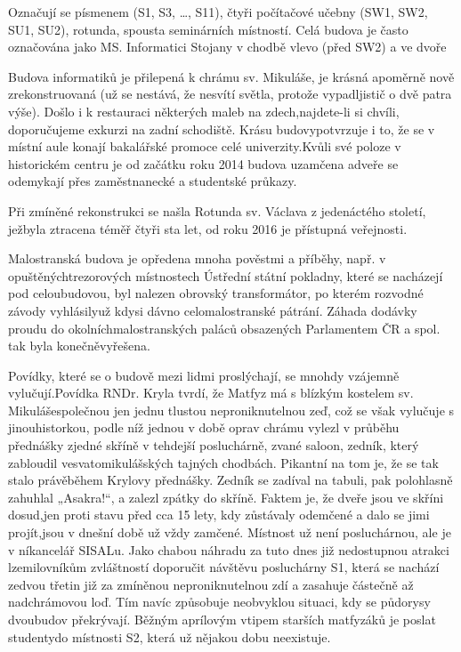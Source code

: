 {Označují se písmenem  (S1, S3, \dots, S11), čtyři počítačové učebny (SW1,
SW2, SU1, SU2), rotunda, spousta seminárních místností. Celá budova je často
označována jako MS.}
{Informatici}
{Stojany v chodbě vlevo (před SW2) a ve dvoře}

\noindent Budova informatiků je přilepená k chrámu sv. Mikuláše, je krásná
apoměrně nově zrekonstruovaná (už se nestává, že nesvítí světla, protože
vypadljistič o dvě patra výše). Došlo i k restauraci některých maleb na
zdech,najdete-li si chvíli, doporučujeme exkurzi na zadní schodiště. Krásu
budovypotvrzuje i to, že se v místní aule konají bakalářské promoce celé
univerzity.Kvůli své poloze v historickém centru je od začátku roku 2014 budova
uzamčena adveře se odemykají přes zaměstnanecké a studentské průkazy.

Při zmíněné rekonstrukci se našla Rotunda sv. Václava z jedenáctého století,
ježbyla ztracena téměř čtyři sta let, od roku 2016 je přístupná veřejnosti.

Malostranská budova je opředena mnoha pověstmi a příběhy, např. v
opuštěnýchtrezorových místnostech Ústřední státní pokladny, které se nacházejí
pod celoubudovou, byl nalezen obrovský transformátor, po kterém rozvodné závody
vyhlásilyuž kdysi dávno celomalostranské pátrání. Záhada dodávky proudu do
okolníchmalostranských paláců obsazených Parlamentem ČR a spol. tak byla
konečněvyřešena.

Povídky, které se o budově mezi lidmi proslýchají, se mnohdy vzájemně
vylučují.Povídka RNDr. Kryla tvrdí, že Matfyz má s blízkým kostelem sv.
Mikulášespolečnou jen jednu tlustou neproniknutelnou zeď, což se však vylučuje s
jinouhistorkou, podle níž jednou v době oprav chrámu vylezl v průběhu přednášky
zjedné skříně v tehdejší posluchárně, zvané saloon, zedník, který zabloudil
vesvatomikulášských tajných chodbách. Pikantní na tom je, že se tak stalo
právěběhem Krylovy přednášky. Zedník se zadíval na tabuli, pak polohlasně
zahuhlal „Asakra!“, a zalezl zpátky do skříně. Faktem je, že dveře jsou ve
skříni dosud,jen proti stavu před cca 15 lety, kdy zůstávaly odemčené a dalo se
jimi projít,jsou v dnešní době už vždy zamčené. Místnost už není posluchárnou,
ale je v níkancelář SISALu. Jako chabou náhradu za tuto dnes již nedostupnou
atrakci lzemilovníkům zvláštností doporučit návštěvu posluchárny S1, která se
nachází zedvou třetin již za zmíněnou neproniknutelnou zdí a zasahuje částečně
až nadchrámovou loď. Tím navíc způsobuje neobvyklou situaci, kdy se půdorysy
dvoubudov překrývají. Běžným aprílovým vtipem starších matfyzáků je poslat
studentydo místnosti S2, která už nějakou dobu neexistuje.

